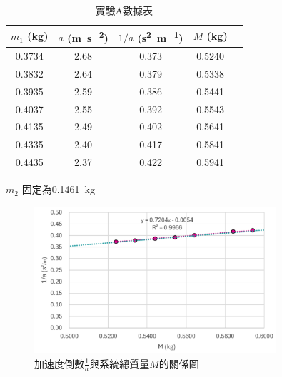 \documentclass[11pt,a4paper]{article}
\theoremstyle{definition}
\begin{document}
            \begin{table}[H]
                \centering
                \caption{實驗A數據表}
                \label{tab:expA_data}
                \begin{tabular}{|c|c|c|c|c|}
                    \hline
                    $m_1$ (\si{\kilogram}) &  $a$ (\si{\meter\per\second\squared}) & $1/a$ (\si{\second\squared\per\meter}) & $M$ (\si{\kilogram}) \\
                    \hline
                    0.3734 & 2.68 & 0.373 & 0.5240 \\ \hline
                    0.3832 & 2.64 & 0.379 & 0.5338 \\ \hline
                    0.3935 & 2.59 & 0.386 & 0.5441 \\ \hline
                    0.4037 & 2.55 & 0.392 & 0.5543 \\ \hline
                    0.4135 & 2.49 & 0.402 & 0.5641 \\ \hline
                    0.4335 & 2.40 & 0.417 & 0.5841 \\ \hline
                    0.4435 & 2.37 & 0.422 & 0.5941 \\
                    \hline
                \end{tabular}
            \end{table}
            
            $m_2$ 固定為\SI{0.1461}{\kilogram}

            \begin{figure}[H]
                
                \centering
                \includegraphics[width=0.8\textwidth]{實驗A數據圖.png}
                \caption{加速度倒數$\displaystyle\frac{1}{a}$與系統總質量$M$的關係圖}
                \label{fig:實驗A數據圖}

            \end{figure}
\end{document}
